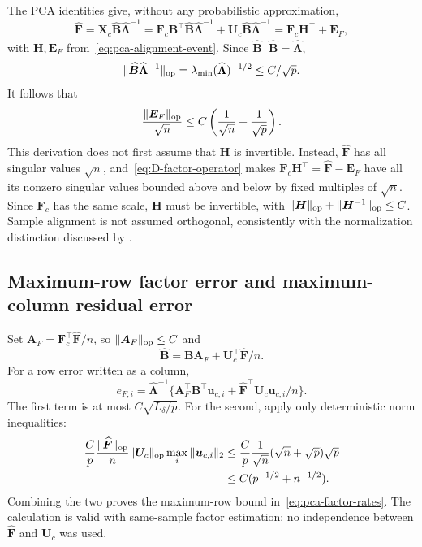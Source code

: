 The PCA identities give, without any probabilistic approximation,
\[
 \widehat{\bm{F}}=\bm{X}_c\widehat{\bm{B}}\widehat{\bm{\Lambda}}^{-1}
 =\bm{F}_c\bm{B}^\top\widehat{\bm{B}}\widehat{\bm{\Lambda}}^{-1}
       +\bm{U}_c\widehat{\bm{B}}\widehat{\bm{\Lambda}}^{-1}
 =\bm{F}_c\bm{H}^\top+\bm{E}_F,
\]
with $\bm{H},\bm{E}_F$ from~\eqref{eq:pca-alignment-event}. Since $\widehat{\bm{B}}^\top\widehat{\bm{B}}=\widehat{\bm{\Lambda}}$,
\[
 \|\widehat{\bm{B}}\widehat{\bm{\Lambda}}^{-1}\|_{\rm op}
 =\lambda_{\min}(\widehat{\bm{\Lambda}})^{-1/2}\le C/\sqrt p.
\]
It follows that
\begin{equation}
 \frac{\|\bm{E}_F\|_{\rm op}}{\sqrt n}
 \le C\left(\frac1{\sqrt n}+\frac1{\sqrt p}\right).
 \label{eq:D-factor-operator}
\end{equation}
This derivation does not first assume that $\bm{H}$ is invertible. Instead, $\widehat{\bm{F}}$ has all singular values $\sqrt n$, and~\eqref{eq:D-factor-operator} makes $\bm{F}_c\bm{H}^\top=\widehat{\bm{F}}-\bm{E}_F$ have all its nonzero singular values bounded above and below by fixed multiples of $\sqrt n$. Since $\bm{F}_c$ has the same scale, $\bm{H}$ must be invertible, with $\|\bm{H}\|_{\rm op}+\|\bm{H}^{-1}\|_{\rm op}\le C$. Sample alignment is not assumed orthogonal, consistently with the normalization distinction discussed by \citet{BaiNg2013}.

\subsection{Maximum-row factor error and maximum-column residual error}
\label{subapp:pca-row-column}
Set $\bm{A}_F=\bm{F}_c^\top\widehat{\bm{F}}/n$, so $\|\bm{A}_F\|_{\rm op}\le C$ and
\[
 \widehat{\bm{B}}=\bm{B}\bm{A}_F+\bm{U}_c^\top\widehat{\bm{F}}/n.
\]
For a row error written as a column,
\begin{equation}
 e_{F,i}=\widehat{\bm{\Lambda}}^{-1}
       \{\bm{A}_F^\top \bm{B}^\top \bm{u}_{c,i}+\widehat{\bm{F}}^\top \bm{U}_c\bm{u}_{c,i}/n\}.
 \label{eq:D-row-expansion}
\end{equation}
The first term is at most $C\sqrt{L_\delta/p}$. For the second, apply only deterministic norm inequalities:
\begin{align*}
 \frac Cp\frac{\|\widehat{\bm{F}}\|_{\rm op}}n
       \|\bm{U}_c\|_{\rm op}\max_i\|\bm{u}_{c,i}\|_2
 &\le\frac Cp\frac1{\sqrt n}(\sqrt n+\sqrt p)\sqrt p\\
 &\le C(p^{-1/2}+n^{-1/2}).
\end{align*}
Combining the two proves the maximum-row bound in~\eqref{eq:pca-factor-rates}. The calculation is valid with same-sample factor estimation: no independence between $\widehat{\bm{F}}$ and $\bm{U}_c$ was used.


